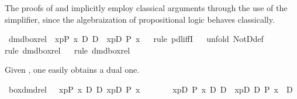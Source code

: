 \begin{isabellebody}
\begin{isamarkuptext}
  The proofs of  and  implicitly employ
  classical arguments through the use of the simplifier, since the algebraization of propositional
  logic behaves classically.
  \label{isa:dmd-box-rel}%
\end{isamarkuptext}%
\isamarkuptrue%
\ dmd{\isacharunderscore}box{\isacharunderscore}rel{\isacharcolon}\ {\isachardoublequote}{\isasymturnstile}\ {\isasymlangle}x{\isasymleftarrow}p{\isasymrangle}{\isacharparenleft}P\ x{\isacharparenright}\ {\isasymlongleftrightarrow}\isactrlsub D\ {\isasymnot}\isactrlsub D\ {\isacharbrackleft}{\isacharhash}\ x{\isasymleftarrow}p{\isacharbrackright}{\isacharparenleft}{\isasymnot}\isactrlsub D\ P\ x{\isacharparenright}{\isachardoublequote}\isanewline
\ \ \isamarkupfalse%
rule\ pdl{\isacharunderscore}iffI{\isacharparenright}\isanewline
\ \ \isamarkupfalse%
unfold\ NotD{\isacharunderscore}def{\isacharparenright}\isanewline
\ \ \isamarkupfalse%
rule\ dmd{\isacharunderscore}box{\isacharunderscore}rel{}{\isacharparenright}\isanewline
\ \ \isamarkupfalse%
rule\ dmd{\isacharunderscore}box{\isacharunderscore}rel{}{\isacharparenright}\isanewline
\isamarkupfalse%
\isamarkupfalse%
%
\begin{isamarkuptext}%
Given , one easily obtains a dual one.%
\end{isamarkuptext}%
\isamarkuptrue%
\ box{\isacharunderscore}dmd{\isacharunderscore}rel{\isacharcolon}\ {\isachardoublequote}{\isasymturnstile}\ {\isacharbrackleft}{\isacharhash}\ x{\isasymleftarrow}p{\isacharbrackright}{\isacharparenleft}P\ x{\isacharparenright}\ {\isasymlongleftrightarrow}\isactrlsub D\ {\isasymnot}\isactrlsub D\ {\isasymlangle}x{\isasymleftarrow}p{\isasymrangle}{\isacharparenleft}{\isasymnot}\isactrlsub D\ P\ x{\isacharparenright}{\isachardoublequote}\isanewline
\isamarkupfalse%
\ {\isacharminus}\isanewline
\ \ \isamarkupfalse%
\ {\isachardoublequote}{\isasymturnstile}\ {\isacharparenleft}\ {\isasymlangle}x{\isasymleftarrow}p{\isasymrangle}{\isacharparenleft}{\isasymnot}\isactrlsub D\ P\ x{\isacharparenright}\ {\isasymlongleftrightarrow}\isactrlsub D\ {\isasymnot}\isactrlsub D\ {\isacharbrackleft}{\isacharhash}\ x{\isasymleftarrow}p{\isacharbrackright}{\isacharparenleft}{\isasymnot}\isactrlsub D\ {\isasymnot}\isactrlsub D\ P\ x{\isacharparenright}\ {\isacharparenright}\ {\isasymlongrightarrow}\isactrlsub D\ \isanewline

\end{isabellebody}
